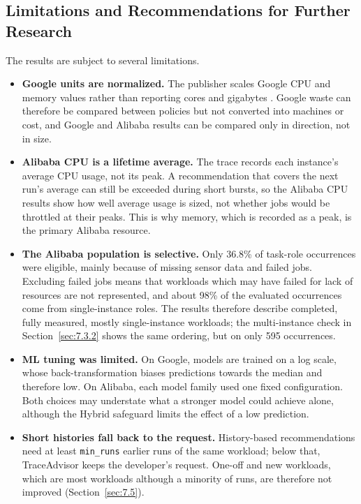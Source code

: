 \subsection{Limitations and Recommendations for Further Research}\label{sec:9.3}

The results are subject to several limitations.

\begin{itemize}
\tightlist
\item
  \textbf{Google units are normalized.} The publisher scales Google CPU and memory values rather than reporting cores and gigabytes \cite{ref7}. Google waste can therefore be compared between policies but not converted into machines or cost, and Google and Alibaba results can be compared only in direction, not in size.
\item
  \textbf{Alibaba CPU is a lifetime average.} The trace records each instance's average CPU usage, not its peak. A recommendation that covers the next run's average can still be exceeded during short bursts, so the Alibaba CPU results show how well average usage is sized, not whether jobs would be throttled at their peaks. This is why memory, which is recorded as a peak, is the primary Alibaba resource.
\item
  \textbf{The Alibaba population is selective.} Only 36.8\% of task-role occurrences were eligible, mainly because of missing sensor data and failed jobs. Excluding failed jobs means that workloads which may have failed for lack of resources are not represented, and about 98\% of the evaluated occurrences come from single-instance roles. The results therefore describe completed, fully measured, mostly single-instance workloads; the multi-instance check in Section~\ref{sec:7.3.2} shows the same ordering, but on only 595 occurrences.
\item
  \textbf{ML tuning was limited.} On Google, models are trained on a log scale, whose back-transformation biases predictions towards the median and therefore low. On Alibaba, each model family used one fixed configuration. Both choices may understate what a stronger model could achieve alone, although the Hybrid safeguard limits the effect of a low prediction.
\item
  \textbf{Short histories fall back to the request.} History-based recommendations need at least \texttt{min\_runs} earlier runs of the same workload; below that, TraceAdvisor keeps the developer's request. One-off and new workloads, which are most workloads although a minority of runs, are therefore not improved (Section~\ref{sec:7.5}).

\end{itemize}
